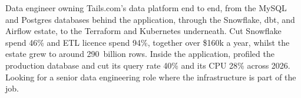 \documentclass[10pt,a4paper,withhyper,ragged2e]{altacv}
\begin{document}
\makecvheader


Data engineer owning Tails.com's data platform end to end, from the MySQL and Postgres databases
behind the application, through the Snowflake, dbt, and Airflow estate, to the Terraform and
Kubernetes underneath. Cut Snowflake spend 46\% and ETL licence spend 94\%, together over \$160k a
year, whilst the estate grew to around 290~billion rows. Inside the application, profiled the
production database and cut its query rate 40\% and its CPU 28\% across 2026. Looking for a senior
data engineering role where the infrastructure is part of the job.

\end{document}
